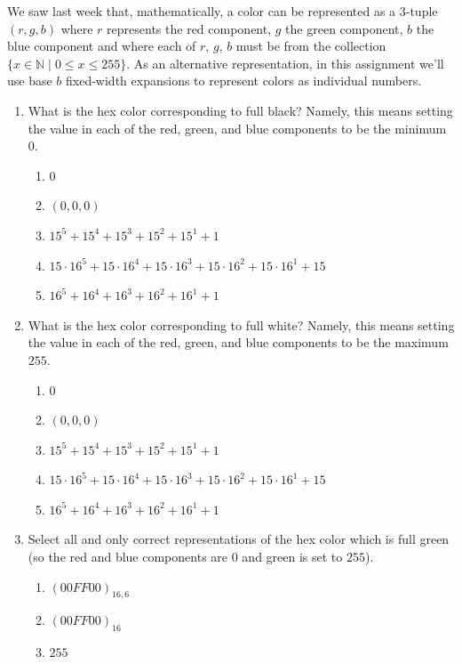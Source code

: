 
We saw last week that, mathematically, a color can be represented as a $3$-tuple $(r, g, b)$ 
where $r$ represents the red component, $g$ the green component, $b$ the blue component and where each of $r$, $g$, $b$ must be from the collection $\{x \in \mathbb{N}\mid 0 \leq x \leq 255 \}$.
As an alternative representation, in this assignment
we'll use base $b$ fixed-width expansions to represent colors
as individual numbers.



\begin{enumerate}
\item What is the hex color corresponding to full black? Namely, this means setting the value in each of the 
    red, green, and blue components to be the minimum $0$.
    \begin{enumerate}
    \item[] $0$
    \item[] $(0,0,0)$
    \item[] $15^{5}+15^4+15^3+15^2+15^1+1$
    \item[] $15\cdot 16^{5}+15\cdot 16^4+15\cdot 16^3+15 \cdot 16^2+15 \cdot 16^1+15$
    \item[] $16^{5}+16^4+16^3+16^2+16^1+1$
    \end{enumerate}
\item What is the hex color corresponding to full white? Namely, this means setting the value in each of the 
red, green, and blue components to be the maximum $255$.
    \begin{enumerate}
    \item[] $0$
    \item[] $(0,0,0)$
    \item[] $15^{5}+15^4+15^3+15^2+15^1+1$
    \item[] $15\cdot 16^{5}+15\cdot 16^4+15\cdot 16^3+15 \cdot 16^2+15 \cdot 16^1+15$
    \item[] $16^{5}+16^4+16^3+16^2+16^1+1$
    \end{enumerate}
\item Select all and only  correct representations of the hex color which is 
full green (so the red and blue components are $0$ and green is set to $255$).
\begin{enumerate}
    \item[] $(00FF00)_{16,6}$
    \item[] $(00FF00)_{16}$
    \item[] $255$

\end{enumerate}
\end{enumerate}

